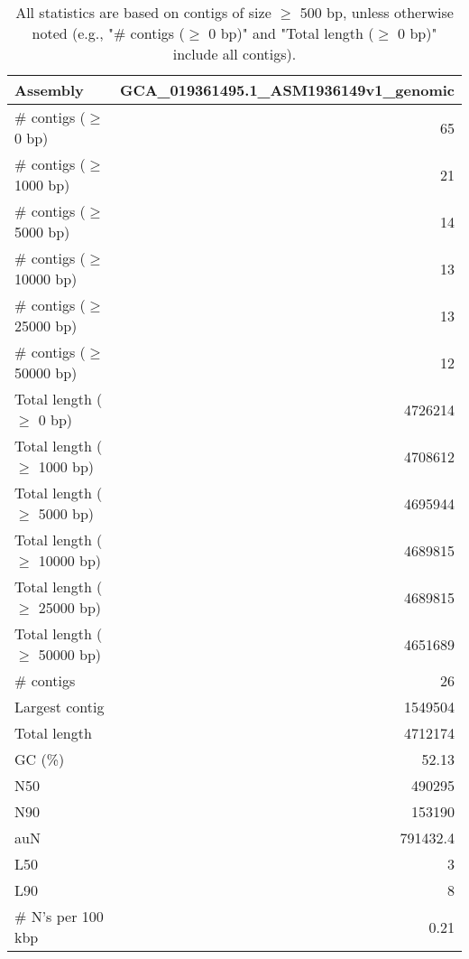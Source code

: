 \documentclass[12pt,a4paper]{article}
\begin{document}
\begin{table}[ht]
\begin{center}
\caption{All statistics are based on contigs of size $\geq$ 500 bp, unless otherwise noted (e.g., "\# contigs ($\geq$ 0 bp)" and "Total length ($\geq$ 0 bp)" include all contigs).}
\begin{tabular}{|l*{1}{|r}|}
\hline
Assembly & GCA\_019361495.1\_ASM1936149v1\_genomic \\ \hline
\# contigs ($\geq$ 0 bp) & 65 \\ \hline
\# contigs ($\geq$ 1000 bp) & 21 \\ \hline
\# contigs ($\geq$ 5000 bp) & 14 \\ \hline
\# contigs ($\geq$ 10000 bp) & 13 \\ \hline
\# contigs ($\geq$ 25000 bp) & 13 \\ \hline
\# contigs ($\geq$ 50000 bp) & 12 \\ \hline
Total length ($\geq$ 0 bp) & 4726214 \\ \hline
Total length ($\geq$ 1000 bp) & 4708612 \\ \hline
Total length ($\geq$ 5000 bp) & 4695944 \\ \hline
Total length ($\geq$ 10000 bp) & 4689815 \\ \hline
Total length ($\geq$ 25000 bp) & 4689815 \\ \hline
Total length ($\geq$ 50000 bp) & 4651689 \\ \hline
\# contigs & 26 \\ \hline
Largest contig & 1549504 \\ \hline
Total length & 4712174 \\ \hline
GC (\%) & 52.13 \\ \hline
N50 & 490295 \\ \hline
N90 & 153190 \\ \hline
auN & 791432.4 \\ \hline
L50 & 3 \\ \hline
L90 & 8 \\ \hline
\# N's per 100 kbp & 0.21 \\ \hline
\end{tabular}
\end{center}
\end{table}
\end{document}
